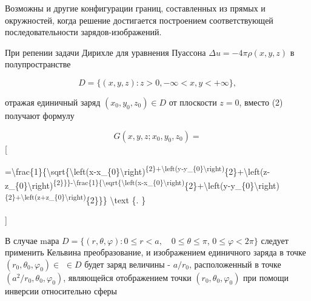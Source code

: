 \documentclass[10pt]{article}
\begin{document}
Возможны и другие конфигурации границ, составленных из прямых и окружностей, когда решение достигается построением соответствующей последовательности зарядов-изображений.



При репении задачи Дирихле для уравнения Пуассона $\Delta u=-4 \pi \rho(x, y, z)$ в полупространстве



\[

D=\{(x, y, z): z>0,-\infty<x, y<+\infty\},

\]



отражая единичный заряд $\left(x_{0}, y_{0}, z_{0}\right) \in D$ от плоскости $z=0$, вместо (2) получают формулу



\[

G\left(x, y, z ; x_{0}, y_{0}, z_{0}\right)=

\][



=\textbackslash frac\{1\}\{\textbackslash sqrt\{\textbackslash left(x-x\_\{0\}\textbackslash right)\textsuperscript{\{2\}+\textbackslash left(y-y\_\{0\}\textbackslash right)}\{2\}+\textbackslash left(z-z\_\{0\}\textbackslash right)\textsuperscript{\{2\}\}\}-\textbackslash frac\{1\}\{\textbackslash sqrt\{\textbackslash left(x-x\_\{0\}\textbackslash right)}\{2\}+\textbackslash left(y-y\_\{0\}\textbackslash right)\textsuperscript{\{2\}+\textbackslash left(z+z\_\{0\}\textbackslash right)}\{2\}\}\} \textbackslash text \{. \}

]



В случае mара $D=\{(r, \theta, \varphi): 0 \leqslant r<a, \quad 0 \leqslant \theta \leqslant \pi$, $0 \leqslant \varphi<2 \pi\}$ следует применить Кельвина преобразование, и изображением единичного заряда в точке $\left(r_{0}, \theta_{0}, \varphi_{0}\right) \in$ $\in D$ будет заряд величины - $a / r_{0}$, расположенный в точке $\left(a^{2} / r_{0}, \theta_{0}, \varphi_{0}\right)$, являющейся отображением точки $\left(r_{0}, \theta_{0}, \varphi_{0}\right)$ при помощи инверсии относительно сферы
\end{document}
